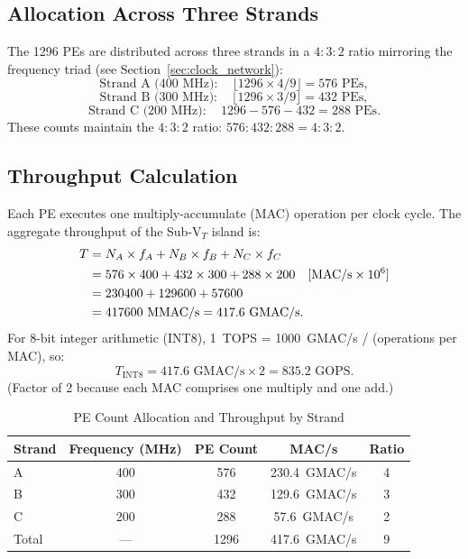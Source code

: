 \subsection{Allocation Across Three Strands}

The 1296 PEs are distributed across three strands in a $4:3:2$ ratio mirroring the
frequency triad (see Section~\ref{sec:clock_network}):
\[
  \text{Strand A (400 MHz)}: \quad \lfloor 1296 \times 4/9 \rfloor = 576 \text{ PEs},
\]
\[
  \text{Strand B (300 MHz)}: \quad \lfloor 1296 \times 3/9 \rfloor = 432 \text{ PEs},
\]
\[
  \text{Strand C (200 MHz)}: \quad 1296 - 576 - 432 = 288 \text{ PEs}.
\]
These counts maintain the $4:3:2$ ratio: $576 : 432 : 288 = 4:3:2$.

\subsection{Throughput Calculation}

Each PE executes one multiply-accumulate (MAC) operation per clock cycle.  The aggregate
throughput of the Sub-V$_T$ island is:
\begin{align}
  T &= N_A \times f_A + N_B \times f_B + N_C \times f_C \notag \\
    &= 576 \times 400 + 432 \times 300 + 288 \times 200 \quad [\text{MAC/s} \times 10^6] \notag \\
    &= 230400 + 129600 + 57600 \notag \\
    &= 417600 \text{ MMAC/s} = 417.6 \text{ GMAC/s}. \notag
\end{align}
For 8-bit integer arithmetic (INT8), 1~TOPS = 1000~GMAC/s / (operations per MAC), so:
\[
  T_{\text{INT8}} = 417.6 \text{ GMAC/s} \times 2 = 835.2 \text{ GOPS}.
\]
(Factor of 2 because each MAC comprises one multiply and one add.)

\begin{table}[htbp]
\centering
\caption{PE Count Allocation and Throughput by Strand}
\label{tab:pe_allocation}
\begin{tabular}{lcccc}
\hline
Strand & Frequency (MHz) & PE Count & MAC/s & Ratio \\
\hline
A & 400 & 576 & 230.4~GMAC/s & 4 \\
B & 300 & 432 & 129.6~GMAC/s & 3 \\
C & 200 & 288 &  57.6~GMAC/s & 2 \\
\hline
Total & --- & 1296 & 417.6~GMAC/s & 9 \\
\hline
\end{tabular}
\end{table}

